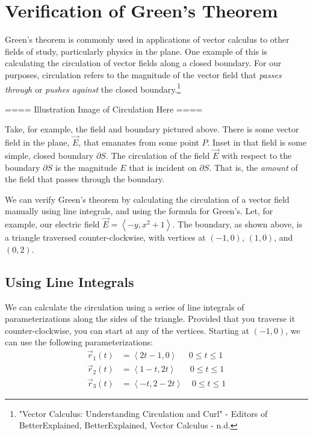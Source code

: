 \documentclass[11pt,English]{article}
\begin{document}
\section{Verification of Green's Theorem}
Green's theorem is commonly used in applications of vector calculus to other fields of study, particularly physics in the plane. One example of this is calculating the circulation of vector fields along a closed boundary. For our purposes, circulation refers to the magnitude of the vector field that \emph{passes through} or \emph{pushes against} the closed boundary.\footnote{"Vector Calculus: Understanding Circulation and Curl" - Editors of BetterExplained, BetterExplained, Vector Calculus - n.d.} 

==== Illustration Image of Circulation Here ====

Take, for example, the field and boundary pictured above. There is some vector field in the plane, $\vec{E}$, that emanates from some point $P$. Inset in that field is some simple, closed boundary $\partial S$. The circulation of the field $\vec{E}$ with respect to the boundary $\partial S$ is the magnitude $E$ that is incident on $\partial S$. That is, the \emph{amount} of the field that passes through the boundary.

We can verify Green's theorem by calculating the circulation of a vector field manually using line integrals, and using the formula for Green's. Let, for example, our electric field $\vec{E} = \left< -y, x^2+1 \right>$. The boundary, as shown above, is a triangle traversed counter-clockwise, with vertices at $\left( -1, 0 \right)$, $\left( 1, 0 \right)$, and $\left(0, 2\right)$.

\subsection{Using Line Integrals}
We can calculate the circulation using a series of line integrals of parameterizations along the sides of the triangle. Provided that you traverse it counter-clockwise, you can start at any of the vertices. Starting at $\left(-1, 0\right)$, we can use the following parameterizations:
\begin{align}
\vec{r}_1(t) &= \left<2t-1, 0\right> \;\;\;\;\; 0 \leq t \leq 1 \\
\vec{r}_2(t) &= \left<1-t, 2t\right> \;\;\;\;\;\; 0 \leq t \leq 1 \\
\vec{r}_3(t) &= \left<-t, 2-2t\right> \;\;\;\; 0 \leq t \leq 1
\end{align}
\end{document}
